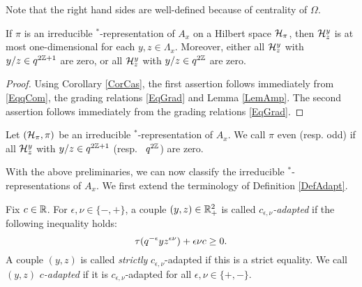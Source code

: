 Note that the right hand sides are well-defined because of centrality of $\Omega$.

\begin{Cor}\label{CorOneDim} If $\pi$ is an irreducible $^*$-representation of $A_x$ on a Hilbert space $\mathcal{H}_{\pi}$, then $\mathcal{H}^y_z$ is at most one-dimensional for each $y,z\in \Lambda_x$. Moreover, either all $\mathcal{H}^y_z$ with $y/z\in q^{2\mathbb{Z}+1}$ are zero, or all $\mathcal{H}^y_z$ with $y/z\in q^{2\mathbb{Z}}$ are zero. 
\end{Cor} 
\begin{proof} 
Using Corollary \ref{CorCas}, the first assertion follows immediately from \eqref{EqqCom}, the grading relations \eqref{EqGrad} and Lemma \ref{LemAmp}. The second assertion follows immediately from the grading relations \eqref{EqGrad}.
\end{proof}

\begin{Def} Let $(\mathcal{H}_{\pi},\pi)$ be an irreducible $^*$-representation of $A_x$. We call $\pi$ even (resp. odd) if all $\mathcal{H}^y_z$ with $y/z \in q^{2\mathbb{Z}+1}$ (resp.~ $q^{2\mathbb{Z}}$) are zero.
\end{Def} 


With the above preliminaries, we can now classify the irreducible $^*$-representations of $A_x$. We first extend the terminology of Definition \ref{DefAdapt}.


\begin{Def} Fix $c\in \mathbb{R}$. For $\epsilon,\nu\in \{-,+\}$, a couple $(y,z)\in \mathbb{R}_+^2$ is called \emph{$c_{\epsilon,\nu}$-adapted} if the following inequality holds: \begin{equation}\label{EqAd} \operatorname{\tau}(q^{-\epsilon}yz^{\epsilon\nu})+\epsilon\nu c\geq 0.\end{equation} A couple $(y,z)$ is called \emph{strictly} $c_{\epsilon,\nu}$-adapted if this is a strict equality. We call $(y,z)$ \emph{$c$-adapted} if it is $c_{\epsilon,\nu}$-adapted for all $\epsilon,\nu\in \{+,-\}$. 
\end{Def} 

